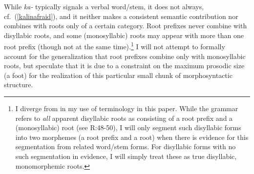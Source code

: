 \documentclass[output=paper,colorlinks,citecolor=brown,
]{langscibook}
\begin{document}
\noindent While \textit{ka-} typically signals a verbal word/stem, it does not always, cf.\ (\ref{kalinafraid}), and it neither makes a consistent semantic contribution nor combines with roots only of a certain category. Root prefixes never combine with disyllabic roots, and some (monosyllabic) roots may appear with more than one root prefix (though not at the same time).\footnote{I diverge from \citealt{Rad81} in my use of terminology in this paper. While the grammar refers to \textit{all} apparent disyllabic roots as consisting of a root prefix and a (monosyllabic) root (see R:48-50), I will only segment such disyllabic forms into two morphemes (a root prefix and a root) when there is evidence for this segmentation from related word/stem forms. For disyllabic forms with no such segmentation in evidence, I will simply treat these as true disyllabic, monomorphemic roots.} I will not attempt to formally account for the generalization that root prefixes combine only with monosyllabic roots, but speculate that it is due to a constraint on the maximum prosodic size (a foot) for the realization of this particular small chunk of morphosyntactic structure.
\end{document}
